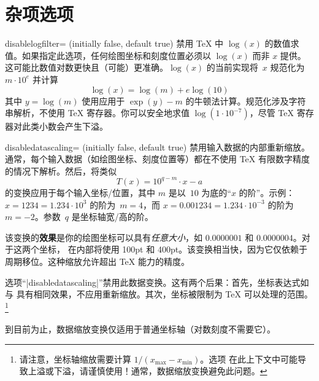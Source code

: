 
\section{杂项选项}
\label{sec:pgfplots:misc}

\begin{pgfplotskey}{disablelogfilter= (initially false, default true)}
    禁用 \TeX{} 中 $\log(x)$ 的数值求值。如果指定此选项，任何绘图坐标和刻度位置必须以 $\log(x)$ 而非 $x$ 提供。这可能比数值对数更快且（可能）更准确。$\log(x)$ 的当前实现将~$x$ 规范化为 $m\cdot 10^e$ 并计算
        \[
            \log(x) = \log(m) + e \log(10)
        \]
    其中 $y = \log(m)$ 使用应用于 $\exp(y) - m$ 的牛顿法计算。规范化涉及字符串解析，不使用 \TeX{} 寄存器。你可以安全地求值 $\log(1\cdot 10^{-7})$，尽管 \TeX{} 寄存器对此类小数会产生下溢。
\end{pgfplotskey}

\begin{pgfplotskey}{disabledatascaling= (initially false, default true)}
\label{pgfplots:disabledatascaling}
    禁用输入数据的内部重新缩放。通常，每个输入数据（如绘图坐标、刻度位置等）都在不使用 \TeX{} 有限数字精度的情况下解析。然后，将类似
        \[ T(x) = 10^{q-m} \cdot x - a \]
    的变换应用于每个输入坐标/位置，其中 $m$ 是以~$10$ 为底的“$x$ 的阶”。示例：$x=1234 = 1.234\cdot 10^3$ 的阶为~$m=4$，而 $x=0.001234 = 1.234\cdot 10^{-3}$ 的阶为 $m=-2$。参数~$q$ 是坐标轴宽/高的阶。

    该变换的\textbf{效果}是你的绘图坐标可以具有\emph{任意大小}，如 $0.0000001$ 和 $0.0000004$。对于这两个坐标，\PGFPlots{} 在内部将使用 100pt 和 400pt。该变换相当快，因为它仅依赖于周期移位。这种缩放允许超出 \TeX{} 能力的精度。

    选项“|disabledatascaling|”禁用此数据变换。这有两个后果：首先，坐标表达式如  与  具有相同效果，不应用重新缩放。其次，坐标被限制为 \TeX{} 可以处理的范围。\footnote{请注意，坐标轴缩放需要计算 $1/( x_{\max} - x_{\min} )$。选项 \protect{} 在此上下文中可能导致上溢或下溢，请谨慎使用！通常，数据缩放变换避免此问题。}

    到目前为止，数据缩放变换仅适用于普通坐标轴（对数刻度不需要它）。
\end{pgfplotskey}

